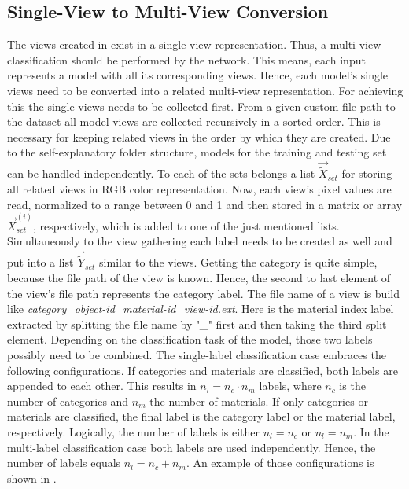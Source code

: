 \subsection{Single-View to Multi-View Conversion}
\label{sec:prepare-data-view-conversion}
The views created in  exist in a single view representation.
Thus, a multi-view classification should be performed by the network.
This means, each input represents a model with all its corresponding views.
Hence, each model's single views need to be converted into a related multi-view representation.
For achieving this the single views needs to be collected first.
From a given custom file path to the dataset all model views are collected recursively in a sorted order.
This is necessary for keeping related views in the order by which they are created.
Due to the self-explanatory folder structure, models for the training and testing set can be handled independently.
To each of the sets belongs a list $\vec{\tilde{X}}_{set}$ for storing all related views in RGB color representation.
Now, each view's pixel values are read, normalized to a range between 0 and 1 and then stored in a matrix or array $\vec{X}_{set}^{(i)}$, respectively, which is added to one of the just mentioned lists.
Simultaneously to the view gathering each label needs to be created as well and put into a list $\vec{\tilde{Y}}_{set}$ similar to the views.
Getting the category is quite simple, because the file path of the view is known.
Hence, the second to last element of the view's file path represents the category label.
The file name of a view is build like \textit{category\_object-id\_material-id\_view-id.ext}.
Here is the material index label extracted by splitting the file name by "\textit{\_}" first and then taking the third split element.
Depending on the classification task of the model, those two labels possibly need to be combined.
The single-label classification case embraces the following configurations.
If categories and materials are classified, both labels are appended to each other.
This results in $n_l = n_c \cdot n_m$ labels, where $n_c$ is the number of categories and $n_m$ the number of materials.
If only categories or materials are classified, the final label is the category label or the material label, respectively.
Logically, the number of labels is either $n_l = n_c$ or $n_l = n_m$.
In the multi-label classification case both labels are used independently.
Hence, the number of labels equals $n_l = n_c + n_m$.
An example of those configurations is shown in .
